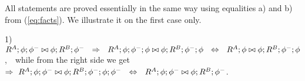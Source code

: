 \documentclass[10pt]{article}
\begin{document}
%
\begin{Proof} 
All statements are proved essentially in the same way using equalities
a) and b) from (\ref{eq:facts}). We illustrate it on the first case
only.

1) \ $R^A;\phi;\phi^-\any \phi;R^B;\phi^- \ \ 
   \impl \ \ R^A;\phi;\phi^-;\phi \any \phi;R^B;\phi^-;\phi \ \ 
   \Iff \ \ R^A;\phi \any \phi;R^B;\phi^-;\phi$,\ \ 
   while from the right side we get \ 
   $\impl \ R^A;\phi;\phi^- \any \phi;R^B;\phi^-;\phi;\phi^- \ \ 
   \Iff \ \ R^A;\phi;\phi^-\any \phi;R^B;\phi^-$.
\end{Proof}
\end{document}
